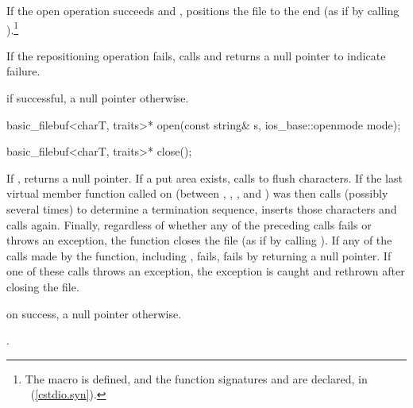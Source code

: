 \begin{itemdescr}
\pnum
If the open operation succeeds and
,
positions the file to the end
(as if by calling
).\footnote{The macro
is defined, and the function signatures
%
and
%
are declared, in
%
~(\ref{cstdio.syn}).}

\pnum
If the repositioning operation fails, calls
and returns a null pointer to indicate failure.

\pnum
\returns
{}
if successful, a null pointer otherwise.
\end{itemdescr}

%
\begin{itemdecl}
basic_filebuf<charT, traits>* open(const string& s,
                                   ios_base::openmode mode);
\end{itemdecl}

\begin{itemdescr}
\returns
{}
\end{itemdescr}

%
\begin{itemdecl}
basic_filebuf<charT, traits>* close();
\end{itemdecl}

\begin{itemdescr}
\pnum
\effects
If
,
returns a null pointer.
If a put area exists, calls
to flush characters.
If the last virtual member function called on
(between
,
,
,
and
)
was
then calls
(possibly several times) to determine a termination sequence, inserts those
characters and calls
again.
Finally, regardless of whether any of the preceding calls fails or throws an
exception, the function closes the file
(as if by calling
%
).
If any of the calls made by the function, including , fails,
 fails by returning a null pointer. If one of these calls throws an
exception, the exception is caught and rethrown after closing the file.

\pnum
\returns
{}
on success, a null pointer otherwise.

\pnum
\postcondition
{}.
\end{itemdescr}

